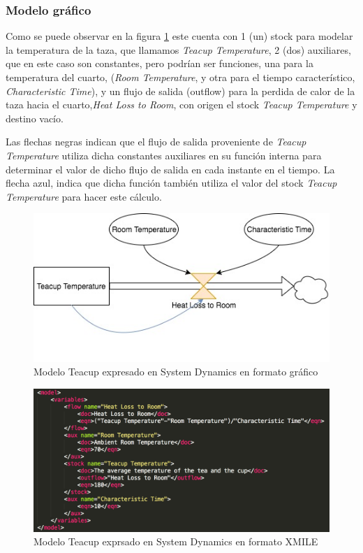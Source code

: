 \subsubsection{Modelo gráfico}
Como se puede observar en la figura \ref{fig:Teacup_sd} este cuenta con 1 (un) stock para modelar la temperatura de la taza, que llamamos \textit{Teacup Temperature}, 2 (dos) auxiliares, que en este caso son constantes, pero podrían ser funciones, una para la temperatura del cuarto, (\textit{Room Temperature}, y otra para el tiempo característico, \textit{Characteristic Time}), y un flujo de salida (outflow) para la perdida de calor de la taza hacia el cuarto,\textit{Heat Loss to Room}, con origen el stock \textit{Teacup Temperature} y destino vacío. 

Las flechas negras indican que el flujo de salida proveniente de \textit{Teacup Temperature} utiliza dicha constantes auxiliares en su función interna para determinar el valor de dicho flujo de salida en cada instante en el tiempo. La flecha azul, indica que dicha función también utiliza el valor del stock \textit{Teacup Temperature} para hacer este cálculo. 

\begin{figure}[!h]
\centering
\includegraphics[scale=0.5]{imagenes/Teacup_sd.jpg}
\caption{Modelo Teacup expresado en System Dynamics en formato gráfico}
\label{fig:Teacup_sd}
\end{figure}

\begin{figure}[!h]
\centering
\includegraphics[scale=0.5]{imagenes/teacup_mapeo/Teacup_variables}
\caption{Modelo Teacup exprsado en System Dynamics en formato XMILE}
\label{fig:Teacup_xmile}
\end{figure}

